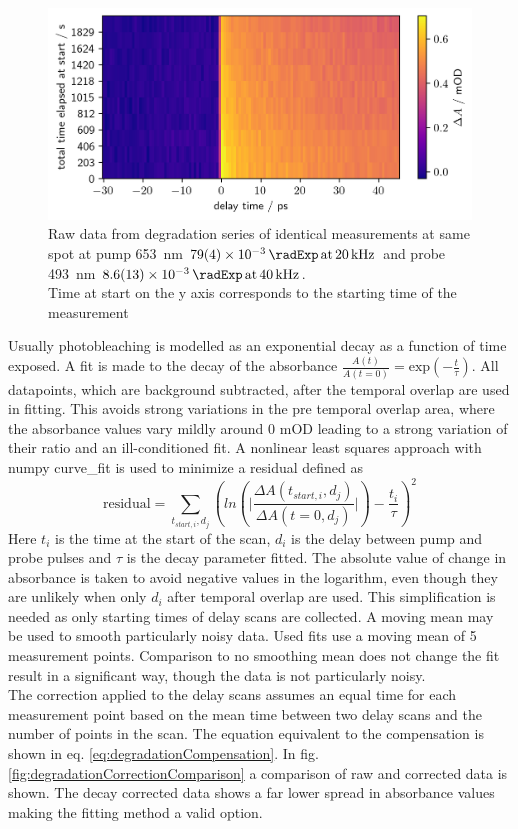 \documentclass[twoside,openright]{scrreprt}
\def\pumpExp#1{\ensuremath{\SI{#1}{\radExp}\,\mathrm{at}\, \SI{20}{\kilo\hertz}}}
\def\probeExp#1{\ensuremath{\SI{#1}{\radExp}\,\mathrm{at}\, \SI{40}{\kilo\hertz}}}
\begin{document}
\begin{figure}[hbtp]
\centering
\includegraphics[width=\linewidth]{images/DegradationRAWPump653Probe493.png}
\caption{Raw data from degradation series of identical measurements at same spot at pump \SI{653}{\nano\meter} \pumpExp{79(4)e-3} and probe \SI{493}{\nano\meter} \probeExp{8.6(1.3)e-3}.\\
Time at start on the y axis corresponds to the starting time of the measurement\label{fig:rawDegradation}}
\end{figure}
Usually photobleaching is modelled as an exponential decay as a function of time exposed. A fit is made to the decay of the absorbance $\frac{A\left(t\right)}{A\left(t=0\right)} = \mathrm{exp}\left(-\frac{t}{\tau}\right)$.
All datapoints, which are background subtracted, after the temporal overlap are used in fitting. This avoids strong variations in the pre temporal overlap area, where the absorbance values vary mildly around 0 mOD leading to a strong variation of their ratio and an ill-conditioned fit. A nonlinear least squares approach with numpy curve\_fit is used to minimize a residual defined as
\begin{equation}\label{eq:degradationFitting}
\mathrm{residual} = \sum_{t_{start,i},d_j} \left(ln\left(\lvert\frac{\Delta A(t_{start,i},d_j)}{\Delta A(t=0,d_j)}\rvert\right)- \frac{t_i}{\tau}\right)^2
\end{equation}
Here $t_i$ is the time at the start of the scan, $d_i$ is the delay between pump and probe pulses and $\tau$ is the decay parameter fitted. The absolute value of change in absorbance is taken to avoid negative values in the logarithm, even though they are unlikely when only $d_i$ after temporal overlap are used.  This simplification is needed as only starting times of delay scans are collected. A moving mean may be used to smooth particularly noisy data. Used fits use a moving mean of 5 measurement points. Comparison to no smoothing mean does not change the fit result in a significant way, though the data is not particularly noisy.\\
The correction applied to the delay scans assumes an equal time for each measurement point based on the mean time between two delay scans and the number of points in the scan. The equation equivalent to the compensation is shown in eq. \ref{eq:degradationCompensation}. In fig. \ref{fig:degradationCorrectionComparison} a comparison of raw and corrected data is shown. The decay corrected data shows a far lower spread in absorbance values making the fitting method a valid option. 
\end{document}
